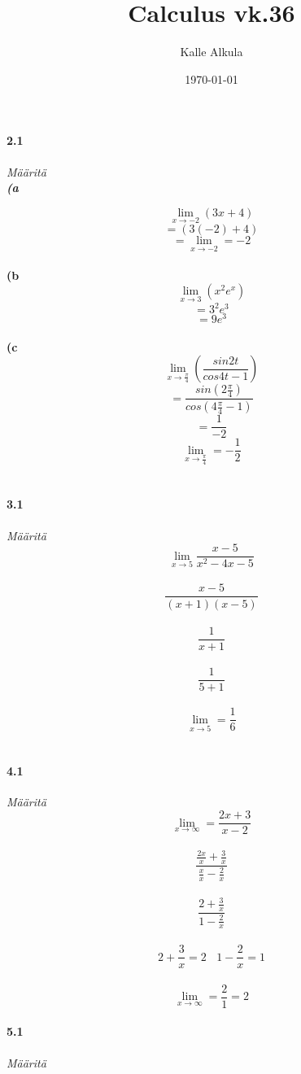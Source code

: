 \documentclass[12pt, a4paper]{article}
\author{Kalle Alkula}
\title{Calculus vk.36}
\date\today
\begin{document}
\maketitle
\thispagestyle{fancy}
    \paragraph*{2.1}
        \textit{
            Määritä\\
            \textbf{(a}
            }

        $$
            \lim_{x \rightarrow -2} (3{x}+4)
        $$
        $$
            =(3(-2)+4)
        $$
        $$
            =\lim_{x \rightarrow -2} = -2
        $$
        \\
            \textbf{(b}
        $$
            \lim_{x \rightarrow 3} (x^2e^x)
        $$
        $$
            = 3^2e^3
        $$
        $$
            = 9e^3
        $$
        \\
            \textbf{(c}
        $$
            \lim_{x\rightarrow\frac{\pi }{4}} (\frac{sin2t}{cos4t-1})
        $$
        $$
            = \frac{sin(2\frac{\pi}{4})}{cos(4\frac{\pi}{4}-1)}
        $$
        $$
            = \frac{1}{-2}
        $$
        $$
            \lim_{x\rightarrow\frac{\pi }{4}} = -\frac{1}{2}
        $$
        \\
    \newpage
    \paragraph*{3.1}
        \textit{
            Määritä
            }
        \\
        $$
        \lim_{x\rightarrow 5} \frac{x - 5}{x^2 - 4x - 5}
        $$
        \\
        $$
        \frac{x - 5}{(x+1)(x - 5)}
        $$
        \\
        $$
        \frac{1}{x + 1}
        $$
        \\
        $$
        \frac{1}{5 + 1}
        $$
        \\
        $$
        \lim_{x\rightarrow 5} = \frac{1}{6}
        $$
        \\
    \paragraph*{4.1}
        \textit{
            Määritä
            }
        \\
        $$
        \lim_{x\rightarrow \infty } = \frac{2x + 3}{x - 2}
        $$
        \\
        $$
        \frac{\frac{2x}{x} + \frac{3}{x}}{\frac{x}{x} - \frac{2}{x}}
        $$
        \\
        $$
        \frac{2 + \frac{3}{x}}{1 - \frac{2}{x}}
        $$
        \\
        $$
        2 + \frac{3}{x} = 2 ~~~~ 1 - \frac{2}{x} = 1
        $$
        \\
        $$
        \lim_{x\rightarrow \infty } = \frac{2}{1} = 2
        $$
    \newpage
    \paragraph*{5.1}
        \textit{
            Määritä
            }
        \\
\end{document}

